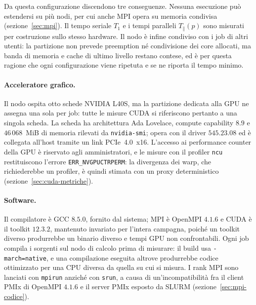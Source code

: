 Da questa configurazione discendono tre conseguenze. Nessuna esecuzione può
estendersi su più nodi, per cui anche MPI opera su memoria condivisa
(sezione~\ref{sec:mpi}). Il tempo seriale $T_1$ e i tempi paralleli
$T_\parallel(p)$ sono misurati per costruzione sullo stesso hardware. Il nodo è
infine condiviso con i job di altri utenti: la partizione non prevede
preemption né condivisione dei core allocati, ma banda di memoria e cache di
ultimo livello restano contese, ed è per questa ragione che ogni configurazione
viene ripetuta e se ne riporta il tempo minimo.

\paragraph{Acceleratore grafico.}
Il nodo ospita otto schede NVIDIA L40S, ma la partizione dedicata alla GPU ne
assegna una sola per job: tutte le misure CUDA si riferiscono pertanto a una
singola scheda. La scheda ha architettura Ada Lovelace, compute capability
$8.9$ e $46\,068$~MiB di memoria rilevati da \texttt{nvidia-smi}; opera con il
driver $545.23.08$ ed è collegata all'host tramite un link PCIe~4.0~x16.
L'accesso ai performance counter della GPU è riservato agli amministratori, e le
misure con il profiler \texttt{ncu} restituiscono l'errore
\texttt{ERR\_NVGPUCTRPERM}: la divergenza dei warp, che richiederebbe un
profiler, è quindi stimata con un proxy deterministico
(sezione~\ref{sec:cuda-metriche}).

\paragraph{Software.}
Il compilatore è GCC $8.5.0$, fornito dal sistema; MPI è OpenMPI $4.1.6$ e CUDA
è il toolkit $12.3.2$, mantenuto invariato per l'intera campagna, poiché un
toolkit diverso produrrebbe un binario diverso e tempi GPU non confrontabili.
Ogni job compila i sorgenti sul nodo di calcolo prima di misurare: il build usa
\texttt{-march=native}, e una compilazione eseguita altrove produrrebbe codice
ottimizzato per una CPU diversa da quella su cui si misura. I rank MPI sono
lanciati con \texttt{mpirun} anziché con \texttt{srun}, a causa di
un'incompatibilità fra il client PMIx di OpenMPI $4.1.6$ e il server PMIx
esposto da SLURM (sezione~\ref{sec:mpi-codice}).
